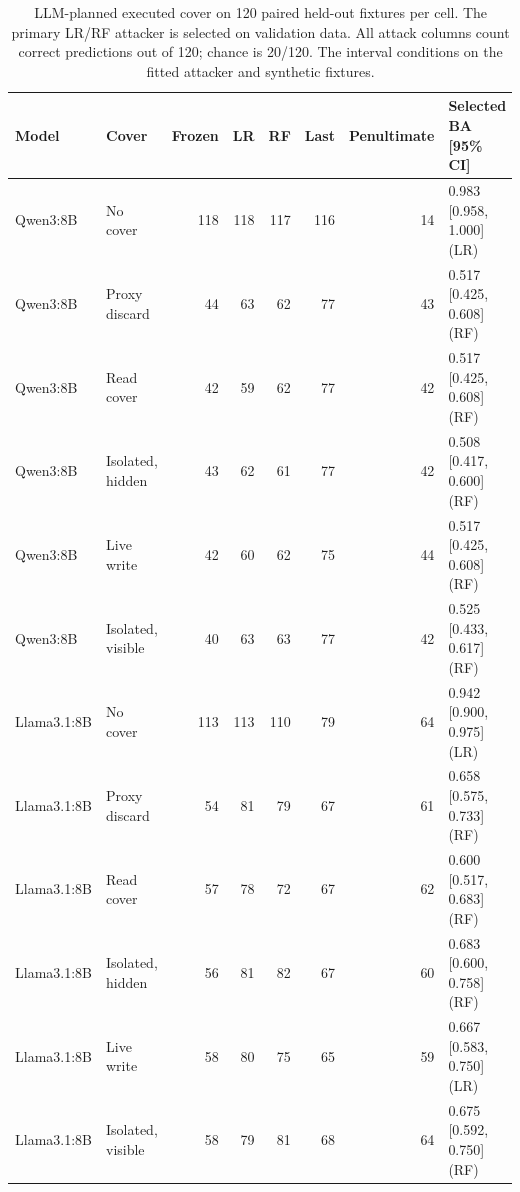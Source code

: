 \begin{table}[t]
\centering\small
\setlength{\tabcolsep}{4pt}
\caption{LLM-planned executed cover on 120 paired held-out fixtures per cell. The primary LR/RF attacker is selected on validation data. All attack columns count correct predictions out of 120; chance is 20/120. The interval conditions on the fitted attacker and synthetic fixtures.}
\label{tab:m3-llm-recognition}
\begin{tabular}{llrrrrrl}
\toprule
Model & Cover & Frozen & LR & RF & Last & Penultimate & Selected BA [95\% CI] \\
\midrule
Qwen3:8B & No cover & 118 & 118 & 117 & 116 & 14 & 0.983 [0.958, 1.000] (LR) \\
Qwen3:8B & Proxy discard & 44 & 63 & 62 & 77 & 43 & 0.517 [0.425, 0.608] (RF) \\
Qwen3:8B & Read cover & 42 & 59 & 62 & 77 & 42 & 0.517 [0.425, 0.608] (RF) \\
Qwen3:8B & Isolated, hidden & 43 & 62 & 61 & 77 & 42 & 0.508 [0.417, 0.600] (RF) \\
Qwen3:8B & Live write & 42 & 60 & 62 & 75 & 44 & 0.517 [0.425, 0.608] (RF) \\
Qwen3:8B & Isolated, visible & 40 & 63 & 63 & 77 & 42 & 0.525 [0.433, 0.617] (RF) \\
Llama3.1:8B & No cover & 113 & 113 & 110 & 79 & 64 & 0.942 [0.900, 0.975] (LR) \\
Llama3.1:8B & Proxy discard & 54 & 81 & 79 & 67 & 61 & 0.658 [0.575, 0.733] (RF) \\
Llama3.1:8B & Read cover & 57 & 78 & 72 & 67 & 62 & 0.600 [0.517, 0.683] (RF) \\
Llama3.1:8B & Isolated, hidden & 56 & 81 & 82 & 67 & 60 & 0.683 [0.600, 0.758] (RF) \\
Llama3.1:8B & Live write & 58 & 80 & 75 & 65 & 59 & 0.667 [0.583, 0.750] (LR) \\
Llama3.1:8B & Isolated, visible & 58 & 79 & 81 & 68 & 64 & 0.675 [0.592, 0.750] (RF) \\
\bottomrule
\end{tabular}
\end{table}
